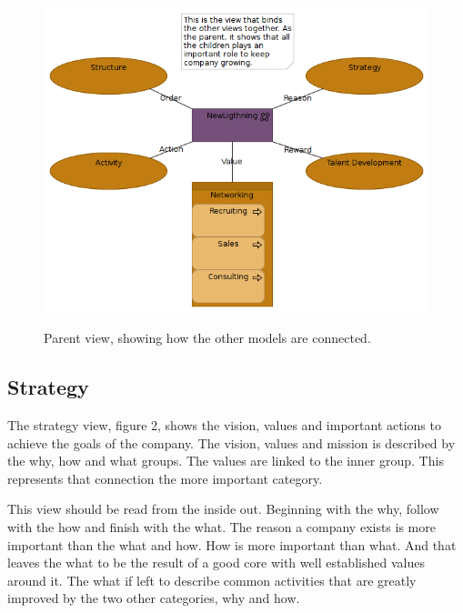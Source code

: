 \documentclass[12pt, a4paper]{article}
\begin{document}
\begin{figure}[htb]
    \centering
    \includegraphics[width=\textwidth]{NewLightning-parent} 
    \label{fig:NewLigthning-parent}
    \caption{Parent view, showing how the other models are connected.}
\end{figure}

\subsection{Strategy}
The strategy view, figure 2, shows the vision, values and important actions to achieve the
goals of the company. The vision, values and mission is described by the why,
how and what groups. The values are linked to the inner group. This represents
that connection the more important category. 

This view should be read from the inside out. Beginning with the why, follow
with the how and finish with the what. The reason a company exists is more
important than the what and how. How is more important than what. And that
leaves the what to be the result of a good core with well established values
around it. The what if left to describe common activities that are greatly
improved by the two other categories, why and how. 
\end{document}
